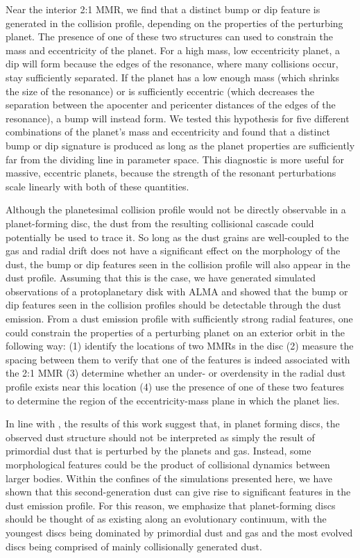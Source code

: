 \documentclass[fleqn,usenatbib]{mnras}
\begin{document}
Near the interior 2:1 MMR, we find that a distinct bump or dip feature is generated in the collision profile, depending on the properties of the perturbing 
planet. The presence of one of these two structures can used to constrain the mass and eccentricity of the planet. For a high mass, low eccentricity 
planet, a dip will form because the edges of the resonance, where many collisions occur, stay sufficiently separated. If the planet 
has a low enough mass (which shrinks the size of the resonance) or is sufficiently eccentric (which decreases the separation between the apocenter 
and pericenter distances of the edges of the resonance), a bump will instead form. We tested this hypothesis for five different combinations of the 
planet's mass and eccentricity and found that a distinct bump or dip signature is produced as long as the planet properties are sufficiently far from 
the dividing line in parameter space. This diagnostic is more useful for massive, eccentric planets, because the strength of the resonant 
perturbations scale linearly with both of these quantities.

Although the planetesimal collision profile would not be directly observable in a planet-forming disc, the dust from the resulting collisional cascade could potentially be used to trace 
it. So long as the dust grains are well-coupled to the gas and radial drift does not have a significant effect on the morphology of the dust, the bump or dip features seen in the collision 
profile will also appear in the dust profile. Assuming that this is the case, we have generated simulated observations of a protoplanetary disk with ALMA and showed that the bump or dip 
features seen in the collision profiles should be detectable through the dust emission. From a dust emission profile with sufficiently strong radial features, one could constrain the 
properties of a perturbing planet on an exterior orbit in the following way: (1) identify the locations of two MMRs in the disc (2) measure the spacing between them to verify that one of the 
features is indeed associated with the 2:1 MMR (3) determine whether an under- or overdensity in the radial dust profile exists near this location (4) use the presence of one of these two 
features to determine the region of the eccentricity-mass plane in which the planet lies.

In line with \citet{2017ApJ...850..103B}, the results of this work suggest that, in planet forming discs, the observed dust structure should not be 
interpreted as simply the result of primordial dust that is perturbed by the planets and gas. Instead, some morphological features could be the product 
of collisional dynamics between larger bodies. Within the confines of the simulations presented here, we have shown that this second-generation dust 
can give rise to significant features in the dust emission profile. For this reason, we emphasize that planet-forming discs should be thought of as 
existing along an evolutionary continuum, with the youngest discs being dominated by primordial dust and gas and the most evolved discs being 
comprised of mainly collisionally generated dust.
\end{document}

